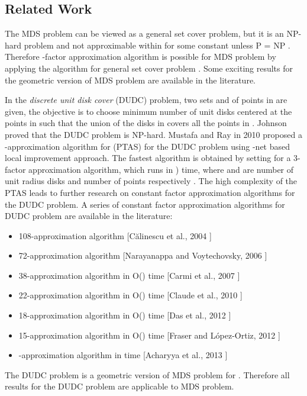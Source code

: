 \documentclass[a4paper,11pt]{article}
\begin{document}
\subsection{Related Work}
The MDS problem can be viewed as a general set cover problem, but it is an NP-hard problem \cite{GJ79,J82} 
and not approximable within  for some constant  unless P = NP \cite{RS97}. Therefore 
-factor approximation algorithm is possible for MDS problem by applying the algorithm for 
general set cover problem \cite{chvatal79}. Some exciting results for the geometric version of MDS problem 
are available in the literature. 

In the {\it discrete unit disk cover} (DUDC) problem, two sets  and  of points in  are given, the 
objective is to choose minimum number of unit disks  centered at the points in  such that 
the union of the disks in  covers all the points in . Johnson \cite{J82} proved that 
the DUDC problem is NP-hard. Mustafa and Ray in 2010 \cite{MR10} proposed a -approximation 
algorithm for  (PTAS) for the DUDC problem using -net based local improvement approach. 
The fastest algorithm is obtained by setting  for a 3-factor approximation algorithm, which runs 
in ) time, where  and  are number of unit radius disks and number of points respectively \cite{DFLN12}. 
The high complexity of the PTAS leads to further research on constant factor 
approximation algorithms for the DUDC problem. A series of constant factor approximation algorithms for DUDC 
problem are available in the literature: 

\begin{itemize}
\item 108-approximation algorithm [C\u{a}linescu et al., 2004 \cite{CMWZ04}]
\item 72-approximation algorithm [Narayanappa and Voytechovsky, 2006 \cite{NV06}]
\item 38-approximation algorithm in O() time [Carmi et al., 2007 \cite{CKL07}]
\item 22-approximation algorithm in O() time [Claude et al., 2010 \cite{CDDDFLNS10}]
\item 18-approximation algorithm in O() time [Das et al., 2012 \cite{DFLN12}]
\item 15-approximation algorithm in O() time [Fraser and L\'{o}pez-Ortiz, 2012 \cite{FL12}]
\item -approximation algorithm in  time 
[Acharyya et al., 2013 \cite{ABD13}]
\end{itemize}

The DUDC problem is a geometric version of MDS problem for . Therefore all results for the DUDC problem 
are applicable to MDS problem.
\end{document}
